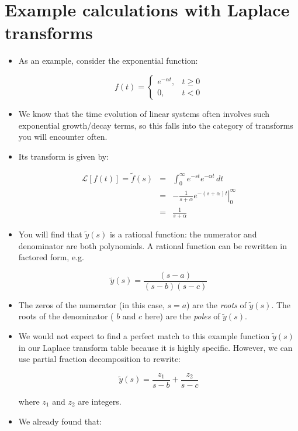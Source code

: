 \documentclass{article}
\newcommand{\Lapl}{\mathcal{L}}
\begin{document}
\section*{Example calculations with Laplace transforms}
\begin{itemize}
\item As an example, consider the exponential function:

\[  f(t)=\begin{cases}
    e^{- \alpha t}, & t \geq 0\\
    0, & t < 0
  \end{cases} \]
  
\item We know that the time evolution of linear systems often involves such exponential growth/decay terms, so this falls into the category of transforms you will encounter often.
\item Its transform is given by:

\begin{eqnarray*}
\Lapl \left[ f(t) \right] = \tilde{f}(s) & = & \int_0^{\infty} e^{-s t} e^{- \alpha t}\, dt\\
& = & - \frac{1}{s + \alpha} \left.  e^{-(s + \alpha)t} \right|_0^{\infty}\\
& = &  \frac{1}{s + \alpha}
\end{eqnarray*}

\item You will find that $\tilde{y}(s)$ is a rational function: the numerator and denominator are both polynomials. A rational function can be rewritten in factored form, e.g.

\[ \tilde{y}(s) = \frac{(s-a)}{(s-b)(s-c)} \]

\item The zeros of the numerator (in this case, $s=a$) are the \textit{roots} of $\tilde{y}(s)$. The roots of the denominator ( $b$ and $c$ here) are the \textit{poles} of $\tilde{y}(s)$.

\item We would not expect to find a perfect match to this example function $\tilde{y}(s)$ in our Laplace transform table because it is highly specific. However, we can use partial fraction decomposition to rewrite:

\[ \tilde{y}(s) = \frac{z_1}{s-b} + \frac{z_2}{s-c}  \]

where $z_1$ and $z_2$ are integers.

\item We already found that:


\end{itemize}
\end{document}
